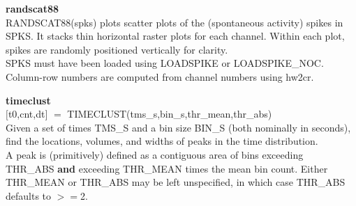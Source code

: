 \item {\bf randscat88}\\
RANDSCAT88(spks) plots scatter plots of the (spontaneous activity) spikes
in SPKS. It stacks thin horizontal raster plots for each channel. Within
each plot, spikes are randomly positioned vertically for clarity.
\\
SPKS must have been loaded using LOADSPIKE or LOADSPIKE\_NOC.
\\
Column-row numbers are computed from channel numbers using hw2cr.

\item {\bf timeclust}\\
{$[$}t0,cnt,dt{$]$} {$=$} TIMECLUST(tms\_s,bin\_s,thr\_mean,thr\_abs)
\\
Given a set of times TMS\_S and a bin size BIN\_S (both nominally in seconds),
find the locations, volumes, and widths of peaks in the time distribution.
\\
A peak is (primitively) defined as a contiguous area of bins exceeding
\\
THR\_ABS {\bf and} exceeding THR\_MEAN times the mean bin count. Either THR\_MEAN
or THR\_ABS may be left unspecified, in which case THR\_ABS defaults to {$>$}{$=$}2.

